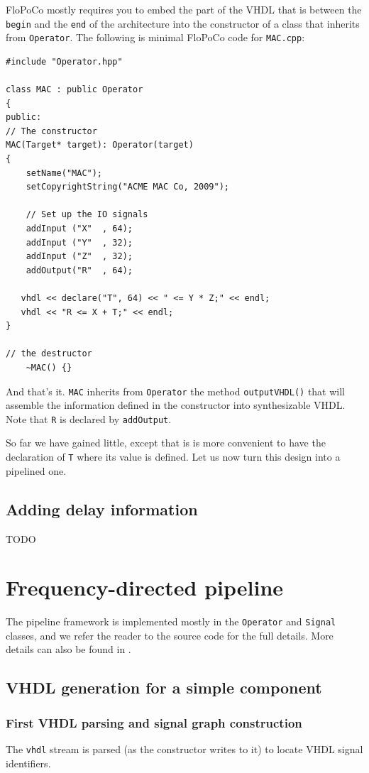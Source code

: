 \documentclass{article}
\begin{document}
FloPoCo mostly requires you to embed the part of the VHDL that is between the \texttt{begin} and the \texttt{end} of the architecture
into the constructor of a class that inherits from
\verb!Operator!. The following is minimal FloPoCo code for
\verb!MAC.cpp!:
\begin{verbatim}
#include "Operator.hpp"

class MAC : public Operator
{
public:
// The constructor
MAC(Target* target): Operator(target)
{
	setName("MAC");
	setCopyrightString("ACME MAC Co, 2009");		

	// Set up the IO signals
	addInput ("X"  , 64);
	addInput ("Y"  , 32);
	addInput ("Z"  , 32);
	addOutput("R"  , 64);

   vhdl << declare("T", 64) << " <= Y * Z;" << endl;
   vhdl << "R <= X + T;" << endl;
}

// the destructor
	~MAC() {}
\end{verbatim}
 
And that's it. \verb!MAC! inherits from \verb!Operator! the method
\verb!outputVHDL()! that will assemble the information defined in the
constructor into synthesizable VHDL. Note that \verb!R! is declared by \verb!addOutput!.

So far we have gained little, except that is is more convenient to
have the declaration of \verb!T! where its value is defined. Let us
now turn this design into a pipelined one.

\subsection{Adding delay information}
TODO

\section{Frequency-directed pipeline}

The  pipeline framework  is implemented mostly in the \texttt{Operator} and \texttt{Signal} classes, and we refer the reader to the source code for the full  details.
More details can also be found in \cite{istoan:hal-01373937}.

\subsection{VHDL generation for a simple component}

\subsubsection{First VHDL parsing and signal graph construction}
The \texttt{vhdl} stream is parsed (as the constructor writes to it) to locate VHDL signal identifiers.
\end{document}
